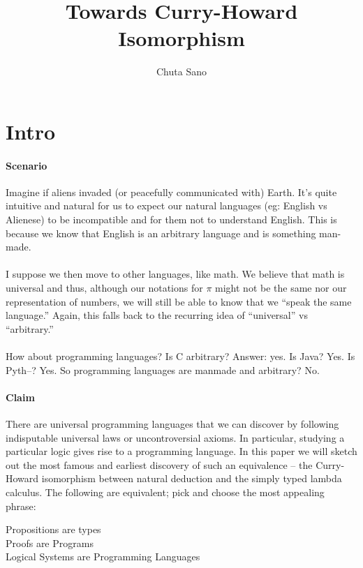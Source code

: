\documentclass[a4paper]{article}
\title{Towards Curry-Howard Isomorphism}
\author{Chuta Sano}
\begin{document}
\maketitle

\section{Intro}
\paragraph{Scenario}
Imagine if aliens invaded (or peacefully communicated with) Earth. It's quite
intuitive and natural for us to expect our natural languages (eg: English vs
Alienese) to be incompatible and for them not to understand English. This is
because we know that English is an arbitrary language and is something man-made.

\paragraph{}
I suppose we then move to other languages, like math. We believe that math is
universal and thus, although our notations for $\pi$ might not be the same nor
our representation of numbers, we will still be able to know that we ``speak the
same language.'' Again, this falls back to the recurring idea of ``universal''
vs ``arbitrary.''

\paragraph{}
How about programming languages? Is C arbitrary? Answer: yes. Is Java? Yes. Is
Pyth--? Yes. So programming languages are manmade and arbitrary? No.

\paragraph{Claim}
There are universal programming languages that we can discover by following
indisputable universal laws or uncontroversial axioms. In particular, studying
a particular logic gives rise to a programming language. In this paper we will
sketch out the most famous and earliest discovery of such an equivalence -- the
Curry-Howard isomorphism between natural deduction and the simply typed lambda
calculus. The following are equivalent; pick and choose the most appealing
phrase:

\begin{center}
  Propositions are types \\
  Proofs are Programs \\ 
  Logical Systems are Programming Languages \\
\end{center}
\end{document}
